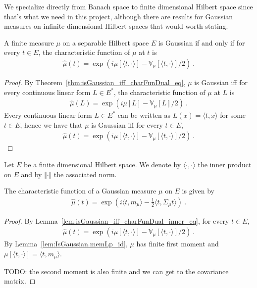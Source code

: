 We specialize directly from Banach space to finite dimensional Hilbert space since that's what we need in this project, although there are results for Gaussian measures on infinite dimensional Hilbert spaces that would worth stating.

\begin{lemma}\label{lem:isGaussian_iff_charFunDual_inner_eq}
A finite measure $\mu$ on a separable Hilbert space $E$ is Gaussian if and only if for every $t \in E$, the characteristic function of $\mu$ at $t$ is
\begin{align*}
  \hat{\mu}(t) =  \exp\left(i \mu[\langle t, \cdot \rangle] - \mathbb{V}_\mu[\langle t, \cdot \rangle] / 2\right) \: .
\end{align*}
\end{lemma}

\begin{proof}
By Theorem~\ref{thm:isGaussian_iff_charFunDual_eq}, $\mu$ is Gaussian iff for every continuous linear form $L \in E^*$, the characteristic function of $\mu$ at $L$ is
\begin{align*}
  \hat{\mu}(L) = \exp\left(i \mu[L] - \mathbb{V}_\mu[L] / 2\right) \: .
\end{align*}
Every continuous linear form $L \in E^*$ can be written as $L(x) = \langle t, x \rangle$ for some $t \in E$, hence we have that $\mu$ is Gaussian iff for every $t \in E$,
\begin{align*}
  \hat{\mu}(t) = \exp\left(i \mu[\langle t, \cdot \rangle] - \mathbb{V}_\mu[\langle t, \cdot \rangle] / 2\right) \: .
\end{align*}
\end{proof}

Let $E$ be a finite dimensional Hilbert space. We denote by $\langle \cdot, \cdot \rangle$ the inner product on $E$ and by $\Vert \cdot \Vert$ the associated norm.


\begin{lemma}\label{lem:IsGaussian.charFun_eq}
The characteristic function of a Gaussian measure $\mu$ on $E$ is given by
\begin{align*}
  \hat{\mu}(t) = \exp\left(i \langle t, m_\mu \rangle - \frac{1}{2} \langle t, \Sigma_\mu t \rangle\right) \: .
\end{align*}
\end{lemma}

\begin{proof}
By Lemma~\ref{lem:isGaussian_iff_charFunDual_inner_eq}, for every $t \in E$,
\begin{align*}
  \hat{\mu}(t) = \exp\left(i \mu[\langle t, \cdot \rangle] - \mathbb{V}_\mu[\langle t, \cdot \rangle] / 2\right) \: .
\end{align*}
By Lemma~\ref{lem:IsGaussian.memLp_id}, $\mu$ has finite first moment and $\mu[\langle t, \cdot \rangle] = \langle t, m_\mu \rangle$.

TODO: the second moment is also finite and we can get to the covariance matrix.
\end{proof}


